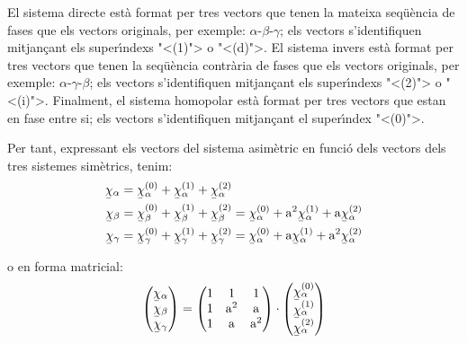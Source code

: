  
 El sistema directe est\`{a} format per tres
vectors que tenen la mateixa seq\"{u}\`{e}ncia de fases que els vectors
originals, per exemple: $\alpha$-$\beta$-$\gamma$; els vectors
s'identifiquen mitjan\c{c}ant els super\'{\i}ndexs {"<}(1){">} o {"<}(d){">}. El sistema
invers est\`{a} format per tres vectors que tenen la seq\"{u}\`{e}ncia contr\`{a}ria
de fases que els vectors originals, per exemple:
$\alpha$-$\gamma$-$\beta$; els vectors s'identifiquen mitjan\c{c}ant els
super\'{\i}ndexs {"<}(2){">} o {"<}(i){">}. Finalment, el sistema homopolar est\`{a}
format per tres vectors que estan en fase entre si; els vectors
s'identifiquen mitjan\c{c}ant el super\'{\i}ndex {"<}(0){">}.

Per tant, expressant els vectors del sistema asim\`{e}tric en funci\'{o}
dels vectors dels tres sistemes sim\`{e}trics, tenim:
\begin{subequations}
\begin{align}
   \cmplx{\chi}_\alpha &= \cmplx{\chi}_\alpha\ap{(0)}  +
   \cmplx{\chi}_\alpha\ap{(1)} + \cmplx{\chi}_\alpha\ap{(2)} \label{eq:c_sim_a}\\
   \cmplx{\chi}_\beta &= \cmplx{\chi}_\beta\ap{(0)} + \cmplx{\chi}_\beta\ap{(1)} +
   \cmplx{\chi}_\beta\ap{(2)}  =  \cmplx{\chi}_\alpha\ap{(0)} + \au^2
   \cmplx{\chi}_\alpha\ap{(1)} + \au \cmplx{\chi}_\alpha\ap{(2)} \label{eq:c_sim_b}\\
   \cmplx{\chi}_\gamma &= \cmplx{\chi}_\gamma\ap{(0)} + \cmplx{\chi}_\gamma\ap{(1)} +
   \cmplx{\chi}_\gamma\ap{(2)}  = \cmplx{\chi}_\alpha\ap{(0)} + \au
   \cmplx{\chi}_\alpha\ap{(1)} + \au^2 \cmplx{\chi}_\alpha\ap{(2)} \label{eq:c_sim_c}
\end{align}
\end{subequations}

o en forma matricial:
\begin{equation}
   \begin{pmatrix}
     \cmplx{\chi}_\alpha \\
     \cmplx{\chi}_\beta \\
     \cmplx{\chi}_\gamma
   \end{pmatrix} =
   \begin{pmatrix}
     1 & 1 & 1 \\
     1 & \au^2 & \au\\
     1 & \au & \au^2
   \end{pmatrix} \cdot
   \begin{pmatrix}
     \cmplx{\chi}_\alpha\ap{(0)} \\
     \cmplx{\chi}_\alpha\ap{(1)} \\
     \cmplx{\chi}_\alpha\ap{(2)}
   \end{pmatrix}
\end{equation}

